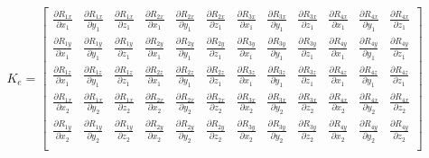 \begin{eqnarray}
K_e = 
\begin{bmatrix}
\frac{\partial R_{1x}}{\partial x_1} & \frac{\partial R_{1x}}{\partial y_1} & \frac{\partial R_{1x}}{\partial z_1} & \frac{\partial R_{2x}}{\partial x_1} & \frac{\partial R_{2x}}{\partial y_1} & \frac{\partial R_{2x}}{\partial z_1} & \frac{\partial R_{3x}}{\partial x_1} & \frac{\partial R_{3x}}{\partial y_1} & \frac{\partial R_{3x}}{\partial z_1} & \frac{\partial R_{4x}}{\partial x_1} & \frac{\partial R_{4x}}{\partial y_1} & \frac{\partial R_{4x}}{\partial z_1} \\
\frac{\partial R_{1y}}{\partial x_1} & \frac{\partial R_{1y}}{\partial y_1} & \frac{\partial R_{1y}}{\partial z_1} & \frac{\partial R_{2y}}{\partial x_1} & \frac{\partial R_{2y}}{\partial y_1} & \frac{\partial R_{2y}}{\partial z_1} & \frac{\partial R_{3y}}{\partial x_1} & \frac{\partial R_{3y}}{\partial y_1} & \frac{\partial R_{3y}}{\partial z_1} & \frac{\partial R_{4y}}{\partial x_1} & \frac{\partial R_{4y}}{\partial y_1} & \frac{\partial R_{4y}}{\partial z_1} \\
\frac{\partial R_{1z}}{\partial x_1} & \frac{\partial R_{1z}}{\partial y_1} & \frac{\partial R_{1z}}{\partial z_1} & \frac{\partial R_{2z}}{\partial x_1} & \frac{\partial R_{2z}}{\partial y_1} & \frac{\partial R_{2z}}{\partial z_1} & \frac{\partial R_{3z}}{\partial x_1} & \frac{\partial R_{3z}}{\partial y_1} & \frac{\partial R_{3z}}{\partial z_1} & \frac{\partial R_{4z}}{\partial x_1} & \frac{\partial R_{4z}}{\partial y_1} & \frac{\partial R_{4z}}{\partial z_1} \\
\frac{\partial R_{1x}}{\partial x_2} & \frac{\partial R_{1x}}{\partial y_2} & \frac{\partial R_{1x}}{\partial z_2} & \frac{\partial R_{2x}}{\partial x_2} & \frac{\partial R_{2x}}{\partial y_2} & \frac{\partial R_{2x}}{\partial z_2} & \frac{\partial R_{3x}}{\partial x_2} & \frac{\partial R_{3x}}{\partial y_2} & \frac{\partial R_{3x}}{\partial z_2} & \frac{\partial R_{4x}}{\partial x_2} & \frac{\partial R_{4x}}{\partial y_2} & \frac{\partial R_{4x}}{\partial z_2} \\
\frac{\partial R_{1y}}{\partial x_2} & \frac{\partial R_{1y}}{\partial y_2} & \frac{\partial R_{1y}}{\partial z_2} & \frac{\partial R_{2y}}{\partial x_2} & \frac{\partial R_{2y}}{\partial y_2} & \frac{\partial R_{2y}}{\partial z_2} & \frac{\partial R_{3y}}{\partial x_2} & \frac{\partial R_{3y}}{\partial y_2} & \frac{\partial R_{3y}}{\partial z_2} & \frac{\partial R_{4y}}{\partial x_2} & \frac{\partial R_{4y}}{\partial y_2} & \frac{\partial R_{4y}}{\partial z_2} \\

\end{bmatrix}
\end{eqnarray}
